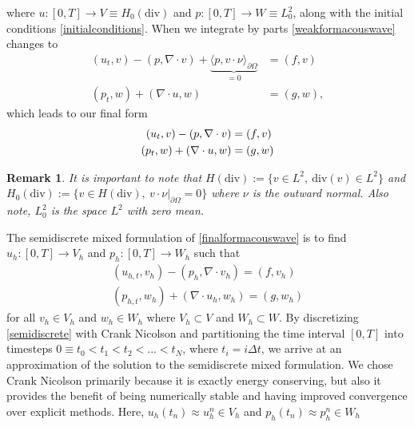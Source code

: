 \documentclass[11pt]{article}
\newtheorem{remark}{Remark}[section]
\newcommand{\divv}{\mathrm{div}}
\begin{document}
where $u:[0,T] \rightarrow V \equiv H_0(\divv)$ and $p:[0,T] \rightarrow W \equiv L_0^2$, %
 along with the initial conditions \eqref{initialconditions}.
When we integrate by parts \eqref{weakformacouswave} changes to 
\begin{equation}
\begin{split}
(u_t,v) - (p,\nabla \cdot v) + \underbrace{\langle p, v \cdot \nu \rangle_{\partial\Omega}}_{=0} &= (f,v) \\
(p_t, w) + (\nabla \cdot u,w) &= (g,w),
\end{split}
\end{equation}
which leads to our final form 
\begin{equation}{\label{finalformacouswave}}
\begin{split}
(u_t,v) - (p,\nabla \cdot v) &= (f,v)\\
(p_t, w) + (\nabla \cdot u,w) &= (g,w)
\end{split}
\end{equation}
\begin{remark}
	It is important to note that $H(\divv):= \{v \in L^2,\: \divv(v) \in L^2\}$ and $H_0(\divv) := \{ v\in H(\divv),\: v \cdot \nu|_{\partial \Omega} = 0 \}$ where $\nu$ is the outward normal. Also note, $L^2_0$ is the space $L^2$ with zero mean.
\end{remark}
The semidiscrete mixed formulation of \eqref{finalformacouswave} is to find $u_h:[0,T] \rightarrow V_h$ and $p_h:[0,T] \rightarrow W_h$ such that
\begin{equation}\label{semidiscrete}
\begin{split}
(u_{h,t},v_h) - (p_h,\nabla \cdot v_h) = (f,v_h)\\
(p_{h,t}, w_h) + (\nabla \cdot u_h,w_h) = (g,w_h)
\end{split}
\end{equation}
for all $v_h \in V_h$ and $w_h \in W_h$ where $V_h \subset V$ and $W_h \subset W$.
By discretizing \eqref{semidiscrete} with Crank Nicolson and partitioning the time interval $[0,T]$ into timesteps $0 \equiv t_0 < t_1 < t_2 < ... < t_N$, where $t_i = i\Delta t$,%
 we arrive at an approximation of the solution to the semidiscrete mixed formulation. We chose Crank Nicolson primarily because it is exactly energy conserving, but also it provides the benefit of being numerically stable and having improved convergence over explicit methods. Here, $u_h(t_n) \approx u^n_h \in V_h$ and $p_h(t_n) \approx p^n_h \in W_h$
\end{document}
